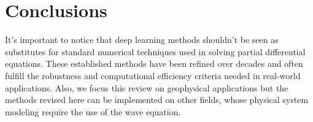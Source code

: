 \documentclass[11pt,twoside]{article}
\begin{document}
\section{Conclusions}\label{sec:final_remarks_and_perspectives}


It's important to notice that deep learning methods shouldn't be seen as substitutes for standard numerical techniques used in solving 
partial differential equations. These established methods have been refined over decades and often fulfill the robustness and computational 
efficiency criteria needed in real-world applications. Also, we focus this review on geophysical applications but the methods revised here 
can be implemented on other fields, whose physical system modeling require the use of the wave equation. 


\end{document}
